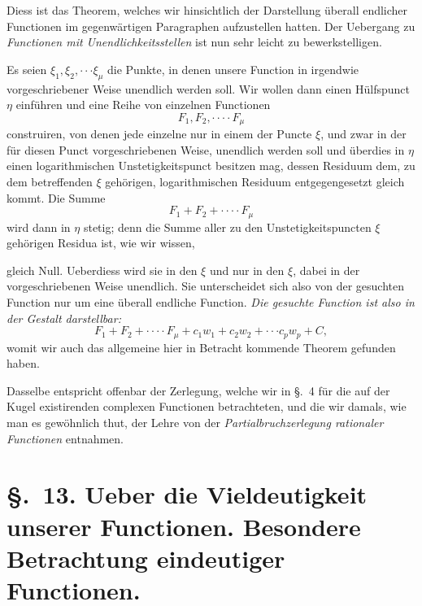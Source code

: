 \documentclass{article}
\begin{document}
Diess ist das Theorem, welches wir hinsichtlich der Darstellung überall endlicher Functionen im gegenwärtigen Paragraphen aufzustellen hatten. Der Uebergang zu \emph{Functionen mit Unendlichkeitsstellen} ist nun sehr leicht zu bewerkstelligen.

Es seien $\xi_{1}, \xi_{2}, \cdot\cdot\cdot \xi_{\mu}$ die Punkte, in denen unsere Function in irgendwie vorgeschriebener Weise unendlich werden soll. Wir wollen dann einen Hülfspunct $\eta$ einführen und eine Reihe von einzelnen Functionen
\[ F_{1}, F_{2}, \cdot\cdot\cdot\cdot F_{\mu} \]
construiren, von denen jede einzelne nur in einem der Puncte $\xi$, und zwar in der für diesen Punct vorgeschriebenen Weise, unendlich werden soll und überdies in $\eta$ einen logarithmischen Unstetigkeitspunct besitzen mag, dessen Residuum dem, zu dem betreffenden $\xi$ gehörigen, logarithmischen Residuum entgegengesetzt gleich kommt. Die Summe
\[ F_{1} + F_{2} + \cdot\cdot\cdot\cdot F_{\mu} \]
wird dann in $\eta$ stetig; denn die Summe aller zu den Unstetigkeitspuncten $\xi$ gehörigen Residua ist, wie wir wissen,

gleich Null. Ueberdiess wird sie in den $\xi$ und nur in den $\xi$, dabei in der vorgeschriebenen Weise unendlich. Sie unterscheidet sich also von der gesuchten Function nur um eine überall endliche Function. \emph{Die gesuchte Function ist also in der Gestalt darstellbar:}
\[ F_{1} + F_{2} + \cdot\cdot\cdot\cdot F_{\mu} + c_{1}w_{1} + c_{2}w_{2} + \cdot\cdot\cdot c_{p}w_{p} + C, \]
womit wir auch das allgemeine hier in Betracht kommende Theorem gefunden haben.

Dasselbe entspricht offenbar der Zerlegung, welche wir in §.~4 für die auf der Kugel existirenden complexen Functionen betrachteten, und die wir damals, wie man es gewöhnlich thut, der Lehre von der \emph{Partialbruchzerlegung rationaler Functionen} entnahmen.

\section*{§.~13. Ueber die Vieldeutigkeit unserer Functionen. Besondere Betrachtung eindeutiger Functionen.}
\end{document}
